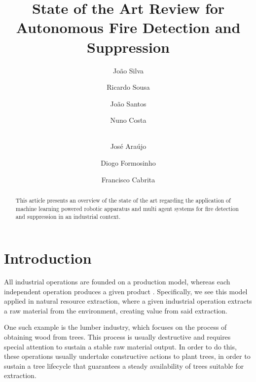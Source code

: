 \documentclass[runningheads]{llncs}
\begin{document}
\title{State of the Art Review for Autonomous Fire Detection and Suppression}

\author{João Silva \and Ricardo Sousa \and
João Santos \and Nuno Costa \and\\ José Araújo \and Diogo Formosinho \and Francisco Cabrita}


\maketitle

\begin{abstract}

This article presents an overview of the state of the art regarding the application of machine learning powered robotic apparatus and multi agent systems for fire detection and suppression in an industrial context.



\end{abstract}

\section{Introduction}
\label{sec:int}


All industrial operations are founded on a production model, whereas each independent operation produces a given product \cite{industrymwd}. Specifically, we see this model applied in natural resource extraction, where a given industrial operation extracts a raw material from the environment, creating value from said extraction.

One such example is the lumber industry, which focuses on the process of obtaining wood from trees. This process is usually destructive and requires special attention to sustain a stable raw material output. In order to do this, these operations usually undertake constructive actions to plant trees, in order to sustain a tree lifecycle that guarantees a steady availability of trees suitable for extraction.
\end{document}
